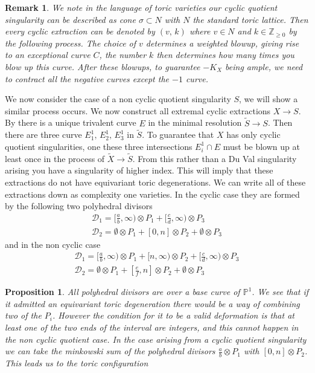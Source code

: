 \documentclass[11pt]{amsart}
\theoremstyle{plain}
\newtheorem{prop}[thm]{Proposition}
\newtheorem*{rem}{Remark}
\newcommand{\ra}{\rightarrow}
\newcommand{\wt}[1]{\widetilde{#1}}
\begin{document}
\begin{rem}
We note in the language of toric varieties our cyclic quotient singularity can be described as cone $\sigma \subset N$ with $N$ the standard toric lattice. Then every cyclic extraction can be denoted by $(v, \, k)$ where $v \in N$ and $k \in \mathbb{Z}_{\geq 0}$ by the following process. The choice of $v$ determines a weighted blowup, giving rise to an exceptional curve $C$, the number $k$ then determines how many times you blow up this curve. After these blowups, to guarantee $-K_X$ being ample, we need to contract all the negative curves except the $-1$ curve.
\end{rem}

We now consider the case of a non cyclic quotient singularity $S$, we will show a similar process occurs. We now construct all extremal cyclic extractions $X \ra S$. By \cite{Br} there is a unique trivalent curve $E$ in the minimal resolution $\wt{S} \ra S$. Then there are three curve $E_1^1, \, E_2^1, \, E_3^1$  in $\wt{S}$. To guarantee that $X$ has only cyclic quotient singularities, one these three intersections $E_i^1 \cap E$ must be blown up at least once in the process of $\wt{X} \ra \wt{S}$. From this rather than a Du Val singularity arising you have a singularity of higher index. This will imply that these extractions do not have equivariant toric degenerations. We can write all of these extractions down as complexity one varieties. In the cyclic case they are formed by the following two polyhedral divisors 
\[
\begin{array}{l}
\mathcal{D}_1 = [\frac{a}{b}, \infty) \otimes P_1 + [\frac{c}{d}, \infty) \otimes P_3 \\
\mathcal{D}_2 =  \emptyset \otimes P_1 + [0, n] \otimes P_2 + \emptyset \otimes P_3
\end{array}
\]
and in the non cyclic case 
\[
\begin{array}{l}
\mathcal{D}_1 = [\frac{a}{b}, \infty) \otimes P_1 + [n, \infty) \otimes P_2 + [\frac{c}{d}, \infty) \otimes P_3 \\
\mathcal{D}_2 =  \emptyset \otimes P_1 + [\frac{e}{f}, n] \otimes P_2 + \emptyset \otimes P_3
\end{array}
\]
\begin{prop}
All polyhedral divisors are over a base curve of $\mathbb{P}^1$. We see that if it admitted an equivariant toric degeneration there would be a way of combining two of the $P_i$. However the condition for it to be a valid deformation is that at least one of the two ends of the interval are integers, and this cannot happen in the non cyclic quotient case. In the case arising from a cyclic quotient singularity we can take the minkowski sum of the polyhedral divisors $\frac{a}{b} \otimes P_1$ with $[0, n] \otimes P_2$. This leads us to the toric configuration 
\end{prop}
\end{document}
